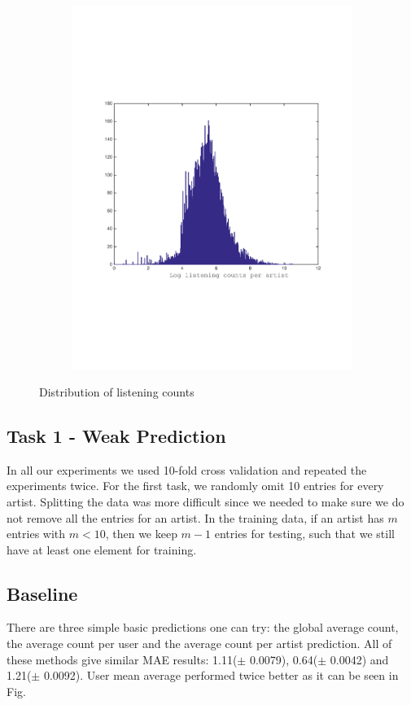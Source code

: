 \begin{figure}[h]
\begin{subfigure}[b]{0.45\textwidth}
    \includegraphics[width=\textwidth]{figures/histCountPerArtist.pdf}
    \caption{}
  \end{subfigure}
  \caption{Distribution of listening counts}
  \label{fig:user_artist_distribution}
\end{figure}

 
\subsection{Task 1 - Weak Prediction}
In all our experiments we used 10-fold cross validation and repeated the experiments twice. For the first task, we randomly omit 10 entries for every artist. Splitting the data was more difficult since we needed to make sure we do not remove all the entries for an artist. In the training data, if an artist has $m$ entries with $m < 10$, then we keep $m-1$ entries for testing, such that we still have at least one element for training.
 
\subsection{Baseline}
There are three simple basic predictions one can try: the global average count, the average count per user and the average count per artist prediction. All of these methods give similar MAE results:  1.11($\pm$ 0.0079), 0.64($\pm$ 0.0042) and 1.21($\pm$ 0.0092). User mean average performed twice better as it can be seen in Fig. 

